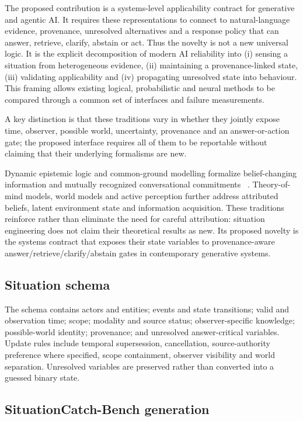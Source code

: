The proposed contribution is a systems-level applicability contract for
generative and agentic AI. It requires these representations to connect to
natural-language evidence, provenance, unresolved alternatives and a response
policy that can answer, retrieve, clarify, abstain or act. Thus the novelty is
not a new universal logic. It is the explicit decomposition of modern AI
reliability into (i) sensing a situation from heterogeneous evidence, (ii)
maintaining a provenance-linked state, (iii) validating applicability and
(iv) propagating unresolved state into behaviour. This framing allows existing
logical, probabilistic and neural methods to be compared through a common set of
interfaces and failure measurements.

A key distinction is that these traditions vary in whether they jointly expose
time, observer, possible world, uncertainty, provenance and an answer-or-action
gate; the proposed interface requires all of them to be reportable without
claiming that their underlying formalisms are new.

Dynamic epistemic logic and common-ground modelling formalize belief-changing
information and mutually recognized conversational commitments
~\cite{vanbenthem1996dynamic,stalnaker2002common}. Theory-of-mind models, world
models and active perception further address attributed beliefs, latent
environment state and information acquisition. These traditions reinforce rather
than eliminate the need for careful attribution: situation engineering does not
claim their theoretical results as new. Its proposed novelty is the systems
contract that exposes their state variables to provenance-aware
answer/retrieve/clarify/abstain gates in contemporary generative systems.

\subsection*{Situation schema}

The schema contains actors and entities; events and state transitions; valid
and observation time; scope; modality and source status; observer-specific
knowledge; possible-world identity; provenance; and unresolved answer-critical
variables. Update rules include temporal supersession, cancellation,
source-authority preference where specified, scope containment, observer
visibility and world separation. Unresolved variables are preserved rather than
converted into a guessed binary state.

\subsection*{SituationCatch-Bench generation}

